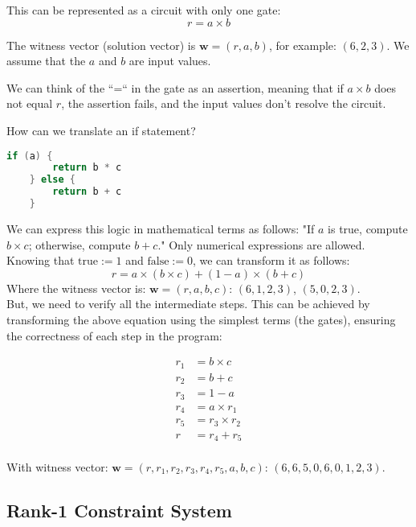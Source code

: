 \documentclass[../lecture-notes.tex]{subfiles}
\begin{document}
This can be represented as a circuit with only one gate:
\[ r = a \times b \]

The witness vector (solution vector) is $\mathbf{w} = (r, a, b)$, for example: $(6, 2, 3)$. We 
assume that the $a$ and $b$ are input values. 

We can think of the ``=`` in the gate as an assertion, meaning that if $a \times b$ does not equal
$r$, the assertion fails, and the input values don't resolve the circuit.

How can we translate an if statement?

\begin{lstlisting}[language=C,numbers=none]
    if (a) {
        return b * c
    } else {
        return b + c
    }
\end{lstlisting}

We can express this logic in mathematical terms as follows: "If $a$ is true, compute 
$b \times c$; otherwise, compute $b + c$." Only numerical expressions are allowed. Knowing that
$\text{true} := 1$ and $\text{false} := 0$, we can transform it as follows:
\[ r = a \times (b \times c) + (1 - a) \times (b + c) \]
Where the witness vector is: $\mathbf{w} = (r, a , b, c)$: $(6, 1, 2, 3)$, $(5, 0, 2, 3)$.\\

But, we need to verify all the intermediate steps. This can be achieved by transforming the above
equation using the simplest terms (the gates), ensuring the correctness of each step in the program: 

\begin{equation*}
    \begin{aligned}
        r_1 &= b \times c \\
        r_2 &= b + c \\
        r_3 &= 1 - a \\
        r_4 &= a \times r_1 \\
        r_5 &= r_3 \times r_2 \\
        r &= r_4 + r_5 \\
    \end{aligned}
\end{equation*}

With witness vector: $\mathbf{w} = (r, r_1, r_2, r_3, r_4, r_5, a , b, c)$: $(6, 6, 5, 0, 6, 0, 1, 2, 3)$.

\subsection{Rank-1 Constraint System}
\end{document}
